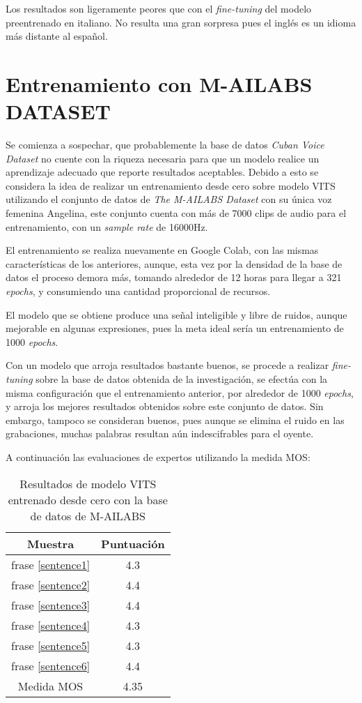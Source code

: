 Los resultados son ligeramente peores que con el \textit{fine-tuning} del modelo preentrenado en italiano. No resulta una gran sorpresa pues el inglés es un idioma más distante al español.

\section{Entrenamiento con M-AILABS DATASET} \label{vits_angel}
Se comienza a sospechar, que probablemente la base de datos \textit{Cuban Voice Dataset} no cuente con la riqueza necesaria para que un modelo realice un aprendizaje adecuado que reporte resultados aceptables. Debido a esto se considera la idea de realizar un entrenamiento desde cero sobre modelo VITS utilizando el conjunto de datos de \textit{The M-AILABS Dataset} con su única voz femenina Angelina, este conjunto cuenta con más de 7000 clips de audio para el entrenamiento, con un \textit{sample rate} de 16000Hz.

El entrenamiento se realiza nuevamente en Google Colab, con las mismas características de los anteriores, aunque, esta vez por la densidad de la base de datos el proceso demora más, tomando alrededor de 12 horas para llegar a 321 \textit{epochs}, y consumiendo una cantidad proporcional de recursos.

El modelo que se obtiene produce una señal inteligible y libre de ruidos, aunque mejorable en algunas expresiones, pues la meta ideal sería un entrenamiento de 1000 \textit{epochs}.

Con un modelo que arroja resultados bastante buenos, se procede a realizar \textit{fine-tuning} sobre la base de datos obtenida de la investigación, se efectúa con la misma configuración que el entrenamiento anterior, por alrededor de 1000 \textit{epochs}, y arroja los mejores resultados obtenidos sobre este conjunto de datos. Sin embargo, tampoco se consideran buenos, pues aunque se elimina el ruido en las grabaciones, muchas palabras resultan aún indescifrables para el oyente.

A continuación las evaluaciones de expertos utilizando la medida MOS:


\begin{table}[H]
	\begin{center} 
\begin{tabular}{ |c|c| } 
	\hline
	Muestra & Puntuación \\
	\hline
	frase \ref{sentence1} & 4.3 \\
	frase \ref{sentence2} & 4.4 \\
	frase \ref{sentence3} & 4.4 \\
	frase \ref{sentence4} & 4.3 \\
	frase \ref{sentence5} & 4.3 \\
	frase \ref{sentence6} & 4.4 \\
	\hline
	Medida MOS & 4.35\\
	\hline
\end{tabular}
\caption{Resultados de modelo VITS entrenado desde cero con la base de datos de M-AILABS} 
\end{center}
\end{table}
	
